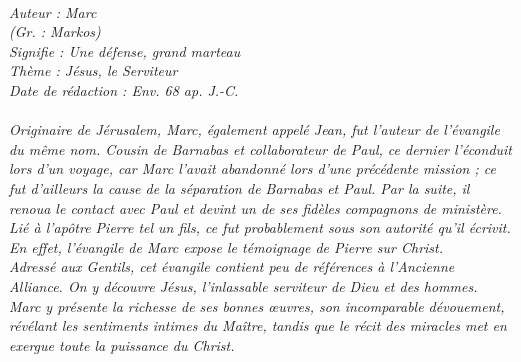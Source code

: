 \BFont
\noindent\hrulefill
{\footnotesize
\textit{
\bigskip
{\centering{}
\\Auteur : Marc
\\(Gr. : Markos)
\\Signifie : Une défense, grand marteau
\\Thème : Jésus, le Serviteur
\\Date de rédaction : Env. 68 ap. J.-C.\\}
}
\textit{
\\Originaire de Jérusalem, Marc, également appelé Jean, fut l’auteur de l’évangile du même nom. Cousin de Barnabas et
collaborateur de Paul, ce dernier l’éconduit lors d’un voyage, car Marc l’avait abandonné lors d’une précédente mission ; ce fut d’ailleurs la cause de la séparation de Barnabas et Paul. Par la suite, il renoua le contact avec Paul et devint un de ses fidèles compagnons de ministère. Lié à l’apôtre Pierre tel un fils, ce fut probablement sous son autorité qu’il écrivit. En effet, l’évangile de Marc expose le témoignage de Pierre sur Christ.
\\Adressé aux Gentils, cet évangile contient peu de références à l’Ancienne Alliance. On y découvre Jésus, l’inlassable
serviteur de Dieu et des hommes. Marc y présente la richesse de ses bonnes œuvres, son incomparable dévouement, révélant les sentiments intimes du Maître, tandis que le  récit des miracles met en exergue toute la puissance du Christ.\bigskip
}
}
\par\nobreak\noindent\hrulefill
